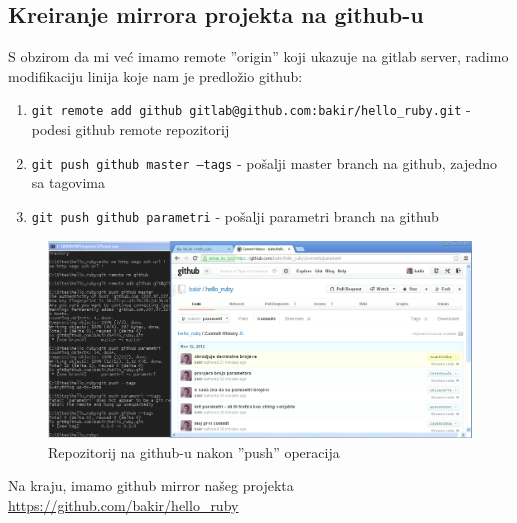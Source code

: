 \documentclass[times, utf8, seminar]{fit}
\begin{document}
\subsection{Kreiranje mirrora projekta na github-u}

S obzirom da mi već imamo remote ''origin'' koji ukazuje na gitlab server, radimo modifikaciju linija koje nam je predložio github:

\begin{enumerate}
  \item \texttt{git remote add github gitlab@github.com:bakir/hello\_ruby.git} - podesi github remote repozitorij
 \item \texttt{git push github master --tags} - pošalji master branch na github, zajedno sa tagovima
 \item \texttt{git push github parametri} - pošalji parametri branch na github
\end{enumerate}

\begin{figure}[H]
\centering
\includegraphics[width=15cm]{img/github_push_branches_and_tags.png}
\caption{Repozitorij na github-u nakon ''push'' operacija}
\end{figure}

Na kraju, imamo github mirror našeg projekta \url{https://github.com/bakir/hello\_ruby}



\end{document}
